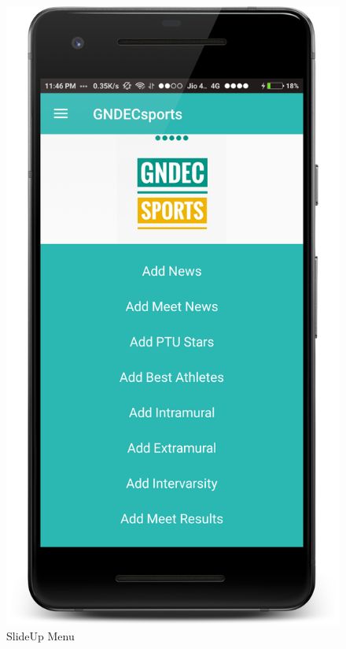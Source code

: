 \begin{figure}[ht]
\centering
\includegraphics[scale=0.20]{images/S10.png}
\caption{SlideUp Menu}
\end{figure}

\newpage

